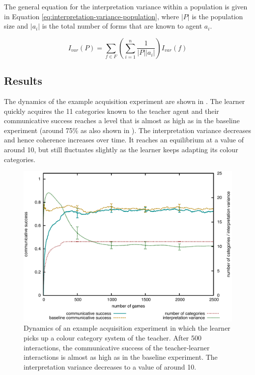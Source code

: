 The general equation for the interpretation variance within a
population is given in Equation
\ref{eq:interpretation-variance-population}, where $|P|$ is the
population size and $|a_i|$ is the total number of forms that are
known to agent $a_i$.

\begin{equation}
I_{var} (P) = \sum_{f \in F} \left(\sum_{i=1}^{n} \frac{1}{|P||a_i|}\right) I_{var} (f)
\label{eq:interpretation-variance-population}
\end{equation}

\subsection{Results}

The dynamics of the example acquisition experiment are shown in . The learner quickly acquires
the 11 categories known to the teacher agent and their communicative
success reaches a level that is almost as high as in the baseline
experiment (around 75\% as also shown in ). The interpretation variance
decreases and hence coherence increases over time. It reaches an
equilibrium at a value of around 10, but still fluctuates slightly as
the learner keeps adapting its colour categories.

\begin{figure}[htbp]
  \begin{center}
    \includegraphics[width=.8\textwidth]{./basic-operators/figures/acquisition.pdf}
    \caption[Dynamics of an example acquisition experiment]{Dynamics
      of an example acquisition experiment in which the learner picks
      up a colour category system of the teacher. After 500
      interactions, the communicative success of the teacher-learner
      interactions is almost as high as in the baseline
      experiment. The interpretation variance decreases to a value of
      around 10.}
    \label{f:basic-strategy-agent-categories}
  \end{center}
\end{figure}

